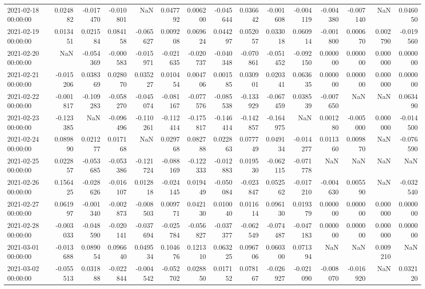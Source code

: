 \begin{tabular}{lrrrrrrrrrrrrrr}
2021-02-18 00:00:00 & 0.024882 & -0.017470 & -0.010801 & NaN & 0.047792 & 0.006200 & -0.045644 & 0.036642 & -0.001608 & -0.004119 & -0.004380 & -0.007140 & NaN & 0.046050 \\
2021-02-19 00:00:00 & 0.013451 & 0.021584 & 0.084158 & -0.065627 & 0.009208 & 0.069624 & 0.044297 & 0.052057 & 0.033018 & 0.060914 & -0.001800 & 0.000670 & 0.002790 & -0.019560 \\
2021-02-20 00:00:00 & NaN & -0.054369 & -0.000583 & -0.015971 & -0.021635 & -0.020737 & -0.040348 & -0.070861 & -0.051452 & -0.092150 & 0.000000 & 0.000000 & 0.000000 & 0.000000 \\
2021-02-21 00:00:00 & -0.015206 & 0.038369 & 0.028070 & 0.035227 & 0.010454 & 0.004706 & 0.001585 & 0.030901 & 0.020341 & 0.063635 & 0.000000 & 0.000000 & 0.000000 & 0.000000 \\
2021-02-22 00:00:00 & -0.001817 & -0.109283 & -0.058270 & -0.045074 & -0.081167 & -0.077576 & -0.085538 & -0.133929 & -0.067459 & 0.038539 & -0.007650 & NaN & NaN & 0.063490 \\
2021-02-23 00:00:00 & -0.123385 & NaN & -0.096496 & -0.110261 & -0.112414 & -0.175817 & -0.146414 & -0.142857 & -0.164975 & NaN & 0.001280 & -0.005000 & 0.000000 & -0.014500 \\
2021-02-24 00:00:00 & 0.089890 & 0.021277 & 0.017168 & NaN & 0.029768 & 0.082788 & 0.022863 & 0.077749 & 0.049134 & -0.014277 & 0.011360 & 0.009870 & NaN & -0.076590 \\
2021-02-25 00:00:00 & 0.022857 & -0.053685 & -0.053386 & -0.121724 & -0.088169 & -0.122333 & -0.012883 & 0.019530 & -0.062115 & -0.071778 & NaN & NaN & NaN & NaN \\
2021-02-26 00:00:00 & 0.156425 & -0.028626 & -0.016107 & 0.012818 & -0.024145 & 0.019449 & -0.050084 & -0.023847 & 0.052562 & -0.017210 & -0.004630 & 0.005590 & NaN & -0.032540 \\
2021-02-27 00:00:00 & 0.061997 & -0.001340 & -0.002873 & -0.008503 & 0.009771 & 0.042130 & 0.010040 & 0.011614 & 0.096130 & 0.019379 & 0.000000 & 0.000000 & 0.000000 & 0.000000 \\
2021-02-28 00:00:00 & -0.003033 & -0.048590 & -0.020141 & -0.037694 & -0.025784 & -0.056827 & -0.037377 & -0.062549 & -0.074487 & -0.047183 & 0.000000 & 0.000000 & 0.000000 & 0.000000 \\
2021-03-01 00:00:00 & -0.013688 & 0.089054 & 0.096640 & 0.049534 & 0.104676 & 0.121310 & 0.063225 & 0.096706 & 0.060300 & 0.071394 & NaN & NaN & 0.009210 & NaN \\
2021-03-02 00:00:00 & -0.055513 & 0.031888 & -0.022844 & -0.004542 & -0.052702 & 0.028850 & 0.017152 & 0.078167 & -0.026927 & -0.021090 & -0.008070 & -0.016920 & NaN & 0.032120 \\

\end{tabular}
